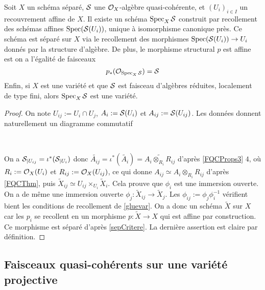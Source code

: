 \begin{cons}	\label{relspec}
Soit $X$ un schéma séparé, $\mathcal{S}$ une $\mathcal{O}_X$-algèbre quasi-cohérente, et $(U_i)_{i\in I}$ un recouvrement affine de $X$. Il existe un schéma $\operatorname{Spec}_X \mathcal{S}$ construit par recollement des schémas affines $\operatorname{Spec}(\mathcal{S}(U_i))$, unique à isomorphisme canonique près. Ce schéma est séparé sur $X$ via le recollement des morphismes $\operatorname{Spec}(\mathcal{S}(U_i))\rightarrow U_i$ donnés par la structure d'algèbre. De plus, le morphisme structural $p$ est affine est on a l'égalité de faisceaux
$$p_*(\mathcal{O}_{\operatorname{Spec}_X\mathcal{S}})=\mathcal{S}$$
Enfin, si $X$ est une variété et que $\mathcal{S}$ est faisceau d'algèbres réduites, localement de type fini, alors $\operatorname{Spec}_X \mathcal{S}$ est une variété.
\end{cons}
\begin{proof}
On note $U_{ij}:=U_i\cap U_j$, $A_i:=\mathcal{S}(U_i)$ et $A_{ij}:=\mathcal{S}(U_{ij})$. Les données donnent naturellement un diagramme commutatif

	\begin{center}
	\\
	\end{center}
	
On a $\mathcal{S}_{|U_{ij}}=\iota^*(\mathcal{S}_{|U_i})$ donc $\widetilde{A_{ij}}=\iota^*(\widetilde{A_i})=\widetilde{A_i \otimes_{R_i}R_{ij}}$ d'après \ref{FQCProps3} $4$, où $R_i:=\mathcal{O}_X(U_i)$ et $R_{ij}:=\mathcal{O}_X(U_{ij})$, ce qui donne $A_{ij}\simeq A_i\otimes_{R_i}R_{ij}$ d'après \ref{FQCThm}, puis $\widetilde{X}_{ij}\simeq U_{ij}\times_{U_i}\widetilde{X}_i$. Cela prouve que $\phi_i$ est une immersion ouverte. On a de même une immersion ouverte $\phi_j:\widetilde{X}_{ij}\rightarrow \widetilde{X}_j$. Les $\phi_{ij}:=\phi_j\phi_i^{-1}$ vérifient bient les conditions de recollement de \ref{gluevar}. On a donc un schéma $\widetilde{X}$ sur $X$ car les $p_i$ se recollent en un morphisme $p:\widetilde{X}\rightarrow X$ qui est affine par construction. Ce morphisme est séparé d'après \ref{sepCritere}. La dernière assertion est claire par définition.
\end{proof}


\subsection{Faisceaux quasi-cohérents sur une variété projective}


